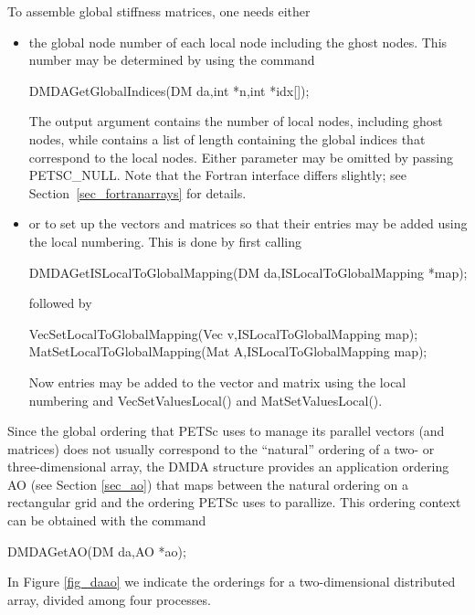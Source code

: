To assemble global stiffness matrices, one needs either
\begin{itemize}
\item
the global node number of each local node
including the ghost nodes. This number may be determined by using the
command
\begin{tabbing}
  DMDAGetGlobalIndices(DM da,int *n,int *idx[]);
\end{tabbing}
The output argument  contains the number of
local nodes, including ghost nodes, while  contains a list of length
 containing the global indices that correspond to the local nodes. Either
parameter may be omitted by passing PETSC\_NULL. Note that the Fortran
interface differs slightly; see Section~\ref{sec_fortranarrays} for details.
\item
or to set up the vectors and matrices so that their entries may be
added using the local numbering. This is done by first calling
\begin{tabbing}
  DMDAGetISLocalToGlobalMapping(DM da,ISLocalToGlobalMapping *map);
\end{tabbing}
followed by
\begin{tabbing}
  VecSetLocalToGlobalMapping(Vec v,ISLocalToGlobalMapping map);\\
  MatSetLocalToGlobalMapping(Mat A,ISLocalToGlobalMapping map);
\end{tabbing}
Now entries may be added to the vector and matrix using the local numbering
and VecSetValuesLocal() and MatSetValuesLocal().
\end{itemize}

Since the global ordering that PETSc uses to manage its parallel vectors
(and matrices) does not usually correspond to the ``natural'' ordering
of a two- or three-dimensional array, the DMDA structure provides
an application ordering AO (see Section \ref{sec_ao}) that maps
between the natural ordering on a rectangular grid and the ordering PETSc
uses to parallize. This ordering context can be obtained with the command
\begin{tabbing}
  DMDAGetAO(DM da,AO *ao);
\end{tabbing}
In Figure \ref{fig_daao} we indicate the orderings for a two-dimensional distributed
array, divided among four processes.

